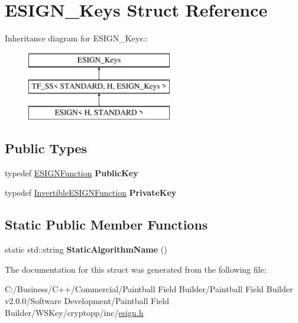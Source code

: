\hypertarget{struct_e_s_i_g_n___keys}{
\section{ESIGN\_\-Keys Struct Reference}
\label{struct_e_s_i_g_n___keys}
}
Inheritance diagram for ESIGN\_\-Keys::\begin{figure}[H]
\begin{center}
\leavevmode
\includegraphics[height=3cm]{struct_e_s_i_g_n___keys}
\end{center}
\end{figure}
\subsection*{Public Types}
\begin{DoxyCompactItemize}
\item 
\hypertarget{struct_e_s_i_g_n___keys_a483df06da0d1268d682596fcfc96c848}{
typedef \hyperlink{class_e_s_i_g_n_function}{ESIGNFunction} {\bfseries PublicKey}}
\label{struct_e_s_i_g_n___keys_a483df06da0d1268d682596fcfc96c848}

\item 
\hypertarget{struct_e_s_i_g_n___keys_a79168232602a9112e28e72fc128e2ec8}{
typedef \hyperlink{class_invertible_e_s_i_g_n_function}{InvertibleESIGNFunction} {\bfseries PrivateKey}}
\label{struct_e_s_i_g_n___keys_a79168232602a9112e28e72fc128e2ec8}

\end{DoxyCompactItemize}
\subsection*{Static Public Member Functions}
\begin{DoxyCompactItemize}
\item 
\hypertarget{struct_e_s_i_g_n___keys_a902d9a2b1a042100ba0d461ef23be0fd}{
static std::string {\bfseries StaticAlgorithmName} ()}
\label{struct_e_s_i_g_n___keys_a902d9a2b1a042100ba0d461ef23be0fd}

\end{DoxyCompactItemize}


The documentation for this struct was generated from the following file:\begin{DoxyCompactItemize}
\item 
C:/Business/C++/Commercial/Paintball Field Builder/Paintball Field Builder v2.0.0/Software Development/Paintball Field Builder/WSKey/cryptopp/inc/\hyperlink{esign_8h}{esign.h}\end{DoxyCompactItemize}
